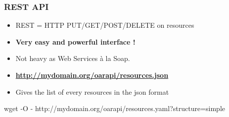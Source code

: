 \documentclass{beamer}
\begin{document}


\begin{frame}
  \frametitle{REST API}

  \begin{block}{}
    \begin{itemize}
      \item REST = HTTP PUT/GET/POST/DELETE on resources 
      \item {\bf Very easy and powerful interface !}
      \item Not heavy as Web Services à la Soap.  
    \end{itemize}
  \end{block}

  \begin{block}{}
    \begin{itemize}
      \item {\bf  \url{http://mydomain.org/oarapi/resources.json} }
      \item  Gives the list of every resources in the json format 
    \end{itemize}
  \end{block}
      wget -O - http://mydomain.org/oarapi/resources.yaml?structure=simple

\end{frame}

\end{document}
